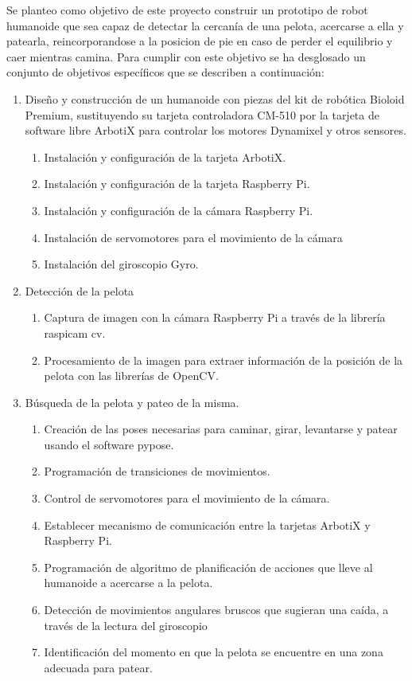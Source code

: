Se planteo como objetivo de este proyecto construir un prototipo de robot humanoide que sea capaz de detectar la cercanía de una pelota, acercarse a ella y patearla, reincorporandose a la posicion de pie en caso de perder el equilibrio y caer mientras camina. Para cumplir con este objetivo se ha desglosado un conjunto de objetivos específicos que se describen a continuación: 

\begin{enumerate}
\item  Diseño y construcción de un humanoide con piezas del kit de robótica Bioloid Premium, sustituyendo su tarjeta controladora
CM-510 por la tarjeta de software libre ArbotiX para controlar los motores Dynamixel y otros sensores.
\begin{enumerate}
\item Instalación y configuración de la tarjeta ArbotiX.
\item Instalación y configuración de la tarjeta Raspberry Pi.
\item Instalación y configuración de la cámara Raspberry Pi.
\item Instalación de servomotores  para el movimiento de la cámara
\item Instalación del giroscopio Gyro.
 
\end{enumerate}


\item Detección de la pelota
\begin{enumerate}
\item Captura de imagen con la cámara Raspberry Pi a través de la librería raspicam cv.
\item Procesamiento de la imagen para extraer información de la posición de la pelota con las librerías de OpenCV.
\end{enumerate}


\item Búsqueda de la pelota y pateo de la misma. 
\begin{enumerate}
\item Creación de las poses necesarias para caminar, girar, levantarse y patear usando el software pypose.
\item Programación de transiciones de movimientos.
\item Control de servomotores para el movimiento de la cámara.
\item Establecer mecanismo de comunicación entre la tarjetas ArbotiX y Raspberry Pi.  
\item Programación de algoritmo de planificación de acciones que lleve al humanoide a acercarse a la pelota.
\item Detección de movimientos angulares bruscos que sugieran una caída, a través de la lectura del giroscopio
\item Identificación del momento en que la pelota se encuentre en una zona adecuada para patear.
\end{enumerate}
\end{enumerate}

